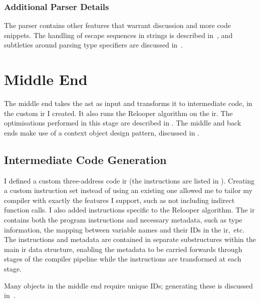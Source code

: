 \documentclass[00-main.tex]{subfiles}
\begin{document}
\subsubsection{Additional Parser Details}

The parser contains other features that warrant discussion and more code snippets.
The handling of escape sequences in strings is described in~, and subtleties around parsing type specifiers are discussed in~.

\section{Middle End}\label{sec:impl:middle end}

The middle end takes the \gls{ast} as input and transforms it to intermediate code, in the custom \gls{ir} I created.
It also runs the Relooper algorithm on the \gls{ir}.
The optimisations performed in this stage are described in .
The middle and back ends make use of a context object design pattern, discussed in .

\subsection{Intermediate Code Generation}

I defined a custom three-address code \gls{ir} (the instructions are listed in ).
Creating a custom instruction set instead of using an existing one allowed me to tailor my compiler with exactly the features I support, such as not including indirect function calls.
I also added instructions specific to the Relooper algorithm.
The \gls{ir} contains both the program instructions and necessary metadata, such as type information, the mapping between variable names and their IDs in the \gls{ir},~etc.
The instructions and metadata are contained in separate substructures within the main \gls{ir} data structure, enabling the metadata to be carried forwards through stages of the compiler pipeline while the instructions are transformed at each stage.

Many objects in the middle end require unique IDs; generating these is discussed in~.
\end{document}
